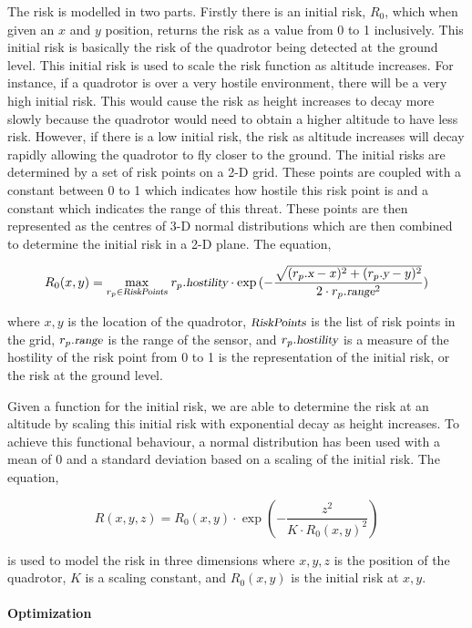 \documentclass[12pt]{article}
\newcommand{\Var}[1]{\ensuremath{{\small{\textsl{#1}}}}}
\newcommand{\Max}[1]{\underset{#1}{\operatorname{max}}\;}
\begin{document}
The risk is modelled in two parts. Firstly there is an initial risk, $R_0$,
which when given an $x$ and $y$ position, returns the risk as a value from 0 to
1 inclusively. This initial risk is basically the risk of the quadrotor being
detected at the ground level. This initial risk is used to scale the risk
function as altitude increases. For instance, if a quadrotor is over a very
hostile environment, there will be a very high initial risk. This would cause
the risk as height increases to decay more slowly because the quadrotor would
need to obtain a higher altitude to have less risk. However, if there is a low
initial risk, the risk as altitude increases will decay rapidly allowing the
quadrotor to fly closer to the ground. The initial risks are determined by a
set of risk points on a 2-D grid. These points are coupled with a constant
between 0 to 1 which indicates how hostile this risk point is and a constant
which indicates the range of this threat. These points are then represented as
the centres of 3-D normal distributions which are then combined to determine
the initial risk in a 2-D plane. The equation,

$$ R_0(x, y) = \Max{r_p \in \Var{RiskPoints}} r_p.\Var{hostility} \cdot
\exp{(-\frac{\sqrt{(r_p.\Var{x} - x)^2 + (r_p.\Var{y} - y)^2}}{
2 \cdot r_p.\Var{range}^2})}$$

where $x, y$ is the location of the quadrotor, $\Var{RiskPoints}$ is the list
of risk points in the grid, $r_p.\Var{range}$ is the range of the sensor, and
$r_p.\Var{hostility}$ is a measure of the hostility of the risk point from 0 to
1 is the representation of the initial risk, or the risk at the ground level.

Given a function for the initial risk, we are able to determine the risk at an
altitude by scaling this initial risk with exponential decay as height
increases. To achieve this functional behaviour, a normal distribution has been
used with a mean of 0 and a standard deviation based on a scaling of the
initial risk. The equation,

$$ R(x, y, z) = R_0(x, y) \cdot \exp{(-\frac{z^2}{K \cdot R_0(x, y)^2})} $$

is used to model the risk in three dimensions where $x, y, z$ is the position
of the quadrotor, $K$ is a scaling constant, and $R_0(x, y)$ is the initial
risk at $x, y$.

\paragraph{Optimization}
\end{document}
